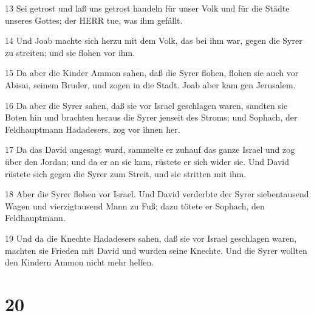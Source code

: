 \par 13 Sei getrost und laß uns getrost handeln für unser Volk und für die Städte unseres Gottes; der HERR tue, was ihm gefällt.
\par 14 Und Joab machte sich herzu mit dem Volk, das bei ihm war, gegen die Syrer zu streiten; und sie flohen vor ihm.
\par 15 Da aber die Kinder Ammon sahen, daß die Syrer flohen, flohen sie auch vor Abisai, seinem Bruder, und zogen in die Stadt. Joab aber kam gen Jerusalem.
\par 16 Da aber die Syrer sahen, daß sie vor Israel geschlagen waren, sandten sie Boten hin und brachten heraus die Syrer jenseit des Stroms; und Sophach, der Feldhauptmann Hadadesers, zog vor ihnen her.
\par 17 Da das David angesagt ward, sammelte er zuhauf das ganze Israel und zog über den Jordan; und da er an sie kam, rüstete er sich wider sie. Und David rüstete sich gegen die Syrer zum Streit, und sie stritten mit ihm.
\par 18 Aber die Syrer flohen vor Israel. Und David verderbte der Syrer siebentausend Wagen und vierzigtausend Mann zu Fuß; dazu tötete er Sophach, den Feldhauptmann.
\par 19 Und da die Knechte Hadadesers sahen, daß sie vor Israel geschlagen waren, machten sie Frieden mit David und wurden seine Knechte. Und die Syrer wollten den Kindern Ammon nicht mehr helfen.

\chapter{20}

